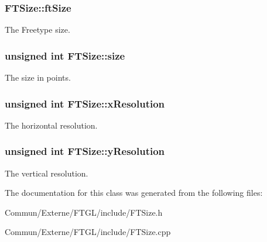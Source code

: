 \subsubsection[{\texorpdfstring{ft\+Size}{ftSize}}]{ F\+T\+Size\+::ft\+Size\hspace{0.3cm}{\ttfamily [private]}}\hypertarget{class_f_t_size_a3269ee1ab4681baeea5fff59b2dfa2a2}{}\label{class_f_t_size_a3269ee1ab4681baeea5fff59b2dfa2a2}
The Freetype size. 
\subsubsection[{\texorpdfstring{size}{size}}]{\setlength{\rightskip}{0pt plus 5cm}unsigned int F\+T\+Size\+::size\hspace{0.3cm}{\ttfamily [private]}}\hypertarget{class_f_t_size_a5d008c161449c9f284c6cce3c76f6f46}{}\label{class_f_t_size_a5d008c161449c9f284c6cce3c76f6f46}
The size in points. 
\subsubsection[{\texorpdfstring{x\+Resolution}{xResolution}}]{\setlength{\rightskip}{0pt plus 5cm}unsigned int F\+T\+Size\+::x\+Resolution\hspace{0.3cm}{\ttfamily [private]}}\hypertarget{class_f_t_size_a0e51d2d3d7169b831c53af633344be21}{}\label{class_f_t_size_a0e51d2d3d7169b831c53af633344be21}
The horizontal resolution. 
\subsubsection[{\texorpdfstring{y\+Resolution}{yResolution}}]{\setlength{\rightskip}{0pt plus 5cm}unsigned int F\+T\+Size\+::y\+Resolution\hspace{0.3cm}{\ttfamily [private]}}\hypertarget{class_f_t_size_aec587814bb4b78030d12838922fe7a6d}{}\label{class_f_t_size_aec587814bb4b78030d12838922fe7a6d}
The vertical resolution. 

The documentation for this class was generated from the following files\+:\begin{DoxyCompactItemize}
\item 
Commun/\+Externe/\+F\+T\+G\+L/include/F\+T\+Size.\+h\item 
Commun/\+Externe/\+F\+T\+G\+L/include/F\+T\+Size.\+cpp\end{DoxyCompactItemize}
